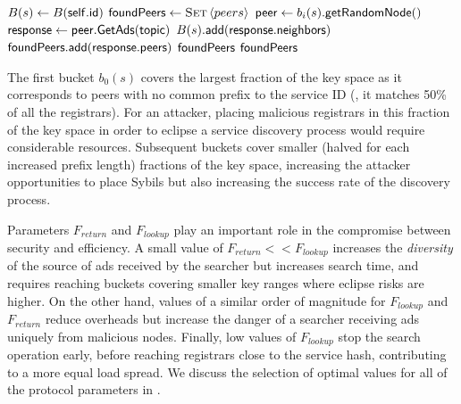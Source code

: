 \begin{algorithm}[]%
    \caption{%
        Lookup algorithm run by searchers.
    }%
    \label{alg:lookup}%
    \begin{algorithmic}[1]%
         \footnotesize
            \State $B(s) \gets B(\mathsf{self.id})$
            \State $\mathsf{foundPeers} \gets  \textsc{Set}\left \langle peers\right \rangle$
                    \State $\mathsf{peer} \gets b_i(s)\mathsf{.getRandomNode()}$
                    \State $\mathsf{response} \gets \mathsf{peer.GetAds(topic)}$
                    \State $B(s)\mathsf{.add}(\mathsf{response.neighbors})$
                    \State $\mathsf{foundPeers.add}(\mathsf{response.peers})$
                        \State \Return $\mathsf{foundPeers}$
                    \EndIf
                \EndFor
            \EndFor
            \State \Return $\mathsf{foundPeers}$
        \EndProcedure
    \end{algorithmic}%
\end{algorithm}%

The first bucket $b_0(s)$ covers the largest fraction of the key space as it corresponds to peers with no common prefix to the service ID (\ie, it matches 50\% of all the registrars).
For an attacker, placing malicious registrars in this fraction of the key space in order to eclipse a service discovery process would require considerable resources.
Subsequent buckets cover smaller (halved for each increased prefix length) fractions of the key space, increasing the attacker opportunities to place Sybils but also increasing the success rate of the discovery process.

Parameters $F_\textit{return}$ and $F_\textit{lookup}$ play an important role in the compromise between security and efficiency.
A small value of $F_\textit{return} << F_\textit{lookup}$ increases the \emph{diversity} of the source of ads received by the searcher but increases search time, and requires reaching buckets covering smaller key ranges where eclipse risks are higher.
On the other hand, values of a similar order of magnitude for $F_\textit{lookup}$ and $F_\textit{return}$ reduce overheads but increase the danger of a searcher receiving ads uniquely from malicious nodes.
Finally, low values of $F_\textit{lookup}$ stop the search operation early, before reaching registrars close to the service hash, contributing to a more equal load spread. 
We discuss the selection of optimal values for all of the protocol parameters in . 




